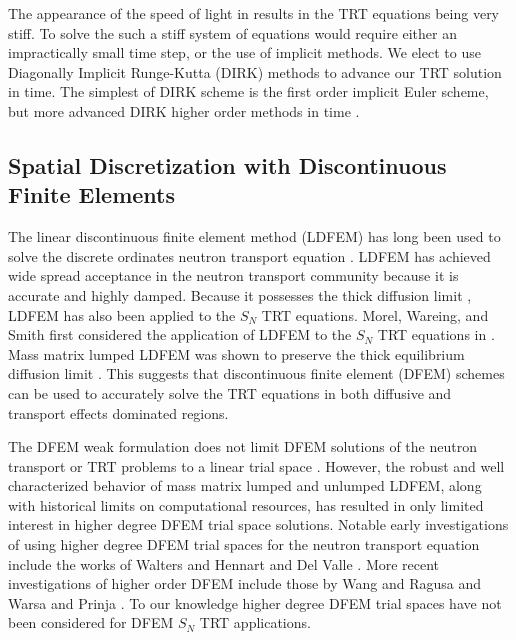 The appearance of the speed of light in  results in the TRT equations being very stiff.
To solve the such a stiff system of equations would require either an impractically small time step, or the use of implicit methods.
We elect to use Diagonally Implicit Runge-Kutta (DIRK) methods to advance our TRT solution in time.
The simplest of DIRK scheme is the first order implicit Euler scheme, but more advanced DIRK higher order methods in time \cite{alexander}.

\subsection{Spatial Discretization with Discontinuous Finite Elements}

The linear discontinuous finite element method (LDFEM) has long been used to solve the discrete ordinates neutron transport equation \cite{reed}.  
LDFEM has achieved wide spread acceptance in the neutron transport community because it is accurate \cite{larsen_nelson} and highly damped.  
Because it possesses the thick diffusion limit \cite{larsen_morel_asymptotics}, LDFEM has also been applied to the $S_N$ TRT equations.  
Morel, Wareing, and Smith first considered the application of LDFEM to the $S_N$ TRT equations in \cite{morel_radtran}.
Mass matrix lumped LDFEM was shown to preserve the thick equilibrium diffusion limit \cite{morel_radtran}.  
This suggests that discontinuous finite element (DFEM) schemes can be used to accurately solve the TRT equations in both diffusive and transport effects dominated regions.

The DFEM weak formulation does not limit DFEM solutions of the neutron transport or TRT problems to a linear trial space \cite{reed}.
However, the robust and well characterized behavior of mass matrix lumped and unlumped LDFEM, along with historical limits on computational resources, has resulted in only limited interest in higher degree DFEM trial space solutions.
Notable early investigations of using higher degree DFEM trial spaces for the neutron transport equation include the works of Walters \cite{walters} and Hennart and  Del Valle \cite{hennart_delvalle_2,hennart_delvalle_3}.
More recent investigations of higher order DFEM include those by Wang and Ragusa \cite{yaqi_ragusa} and Warsa and Prinja \cite{warsa_prinja}.  
To our knowledge higher degree DFEM trial spaces have not been considered for DFEM $S_N$ TRT applications.

